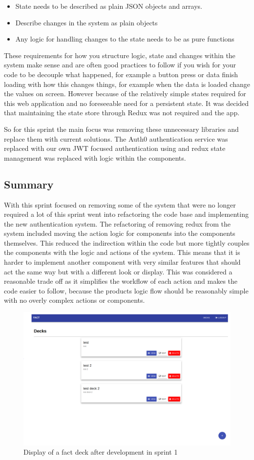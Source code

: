 \begin{itemize}
\item State needs to be described as plain JSON objects and arrays.
\item Describe changes in the system as plain objects
\item Any logic for handling changes to the state needs to be as pure functions
\end{itemize}

These requirements for how you structure logic, state and changes within the system make sense and are often good practices to follow if you wish for your code to be decouple what happened, for example a button press or data finish loading with how this changes things, for example when the data is loaded change the values on screen. However because of the relatively simple states required for this web application and no foreseeable need for a persistent state. It was decided that maintaining the state store through Redux was not required and the app.

So for this sprint the main focus was removing these unnecessary libraries and replace them with current solutions. The Auth0 authentication service was replaced with our own JWT focused authentication using and redux state management was replaced with logic within the components.

\subsection{Summary}
With this sprint focused on removing some of the system that were no longer required a lot of this sprint went into refactoring the code base and implementing the new authentication system. The refactoring of removing redux from the system included moving the action logic for components into the components themselves. This reduced the indirection within the code but more tightly couples the components with the logic and actions of the system. This means that it is harder to implement another component with very similar features that should act the same way but with a different look or display. This was considered a reasonable trade off as it simplifies the workflow of each action and makes the code easier to follow, because the products logic flow should be reasonably simple with no overly complex actions or components.


 \begin{figure}
\includegraphics[width=\textwidth]{s1}
\caption{Display of a fact deck after development in sprint 1}
\centering
\end{figure}
